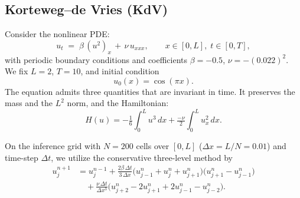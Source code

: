 \documentclass[letterpaper]{article} %
\begin{document}
\subsection{Korteweg--de Vries (KdV)}\label{sec:kdv}
Consider the nonlinear PDE:
\begin{equation}\label{eq:kdv}
    u_t \;=\; \beta\,(u^2)_x \,+\, \nu\, u_{xxx},
    \qquad x \in [0, L],\; t \in [0, T],
\end{equation}
with periodic boundary conditions and coefficients
$\beta = -0.5$, $\nu = -(0.022)^2$.
We fix $L = 2$, $T = 10$, and initial condition
\begin{equation}\label{eq:kdv_ic}
    u_0(x) = \cos(\pi x).
\end{equation}
The equation admits three quantities that are invariant in time. It preserves the mass and the $L^2$ norm, and the Hamiltonian:
\begin{equation}\label{eq:kdv_invariants}
  H(u) = -\tfrac{1}{6}\!\int_0^L u^3\,dx + \tfrac{-\nu}{2}\!\int_0^L u_x^2\,dx.
\end{equation}




On the inference grid with
$N = 200$ cells over $[0,L]$ ($\Delta x = L/N = 0.01$) and time-step $\Delta t$, we utilize the conservative three-level
method by \citet{zakr}
\begin{equation}\label{eq:zk_lf}
\begin{split}
  u_j^{n+1} &= u_j^{n-1} + \tfrac{2\beta\,\Delta t}{3\,\Delta x}\bigl(u_{j-1}^n + u_j^n + u_{j+1}^n\bigr)\bigl(u_{j+1}^n - u_{j-1}^n\bigr) \\
  &\quad + \tfrac{\nu\,\Delta t}{\Delta x^3}\bigl(u_{j+2}^n - 2u_{j+1}^n + 2u_{j-1}^n - u_{j-2}^n\bigr).
\end{split}
\end{equation}
\end{document}
